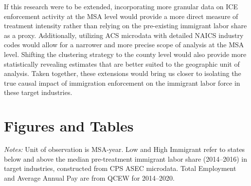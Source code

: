 \documentclass[12pt]{article}
\begin{document}
If this research were to be extended, incorporating more granular data on ICE enforcement activity at the MSA level would provide a more direct measure of treatment intensity rather than relying on the pre-existing immigrant labor share as a proxy. Additionally, utilizing ACS microdata with detailed NAICS industry codes would allow for a narrower and more precise scope of analysis at the MSA level. Shifting the clustering strategy to the county level would also provide more statistically revealing estimates that are better suited to the geographic unit of analysis. Taken together, these extensions would bring us closer to isolating the true causal impact of immigration enforcement on the immigrant labor force in these target industries.

 

\newpage

 
\newpage
\section*{Figures and Tables}

\begin{table}[h]
\centering
\caption{Summary Statistics by Treatment Group}
\begin{minipage}{\textwidth}
\vspace{6pt}
\small\textit{Notes:} Unit of observation is MSA-year. Low and High Immigrant refer to states below and above the median pre-treatment immigrant labor share (2014--2016) in target industries, constructed from CPS ASEC microdata. Total Employment and Average Annual Pay are from QCEW for 2014--2020.
\end{minipage}
\end{table}
\end{document}
